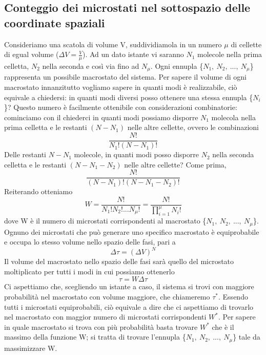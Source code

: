 \documentclass[
10pt, %
a4paper, %
oneside, %
headinclude,footinclude, %
BCOR5mm, %
]{scrartcl}
\begin{document}
\subsection{Conteggio dei microstati nel sottospazio delle coordinate spaziali}
Consideriamo una scatola di volume V, suddividiamola in un numero $\mu$ di cellette di egual volume (\(\Delta V = \frac{V}{\mu}\)). Ad un dato istante vi saranno \(N_1\) molecole nella prima celletta, \(N_2\) nella seconda e così via fino ad $N_{\mu}$. Ogni ennupla  \{\(N_1,\ N_2,\ ...,\ N_\mu\)\} rappresenta un possibile macrostato del sistema. Per sapere il volume di ogni macrostato innanzitutto vogliamo sapere in quanti modi è realizzabile, ciò equivale a chiedersi: in quanti modi diversi posso ottenere una stessa ennupla \{\(N_i\)\}? Questo numero è facilmente ottenibile con considerazioni combinatorie: cominciamo con il chiederci in quanti modi possiamo disporre \(N_1\) molecola nella prima celletta e le restanti \((N-N_1)\) nelle altre cellette, ovvero le combinazioni
\[\frac{N!}{N_1!(N-N_1)!}\]
Delle restanti \(N-N_1\) molecole, in quanti modi posso disporre \(N_2\) nella seconda celletta e le restanti \((N-N_1-N_2)\) nelle altre cellette? Come prima,
\[\frac{N!}{(N-N_1)!(N-N_1-N_2)!}\] 
Reiterando otteniamo
\[W=\frac{N!}{N_1!N_2!...N_\mu!}=\frac{N!}{\prod_{i=1}^{\mu}N_i!}\]
dove W è il numero di microstati corrispondenti al macrostato \{\(N_1,\ N_2,\ ...,\ N_\mu\)\}. Ognuno dei microstati che può generare uno specifico macrostato è equiprobabile e occupa lo stesso volume nello spazio delle fasi, pari a 
\[\Delta\tau = (\Delta V)^N\]
Il volume del macrostato nello spazio delle fasi sarà quello del microstato moltiplicato per tutti i  modi in cui possiamo ottenerlo
\[\tau = W \Delta \tau\]
Ci aspettiamo che, scegliendo un istante a caso, il sistema si trovi con maggiore probabilità nel macrostato con volume maggiore, che chiameremo $\tau^*$. Essendo tutti i microstati equiprobabili, ciò equivale a dire che ci aspettiamo di trovarlo nel macrostato con maggior numero di microstati corrispondenti \(W^*\). Per sapere in quale macrostato si trova con più probabilità basta trovare \(W^*\) che è il massimo della funzione W; si tratta di trovare l'ennupla \{\(N_1,\ N_2,\ ...,\  N_{\mu}\)\} tale da massimizzare W.
\end{document}
